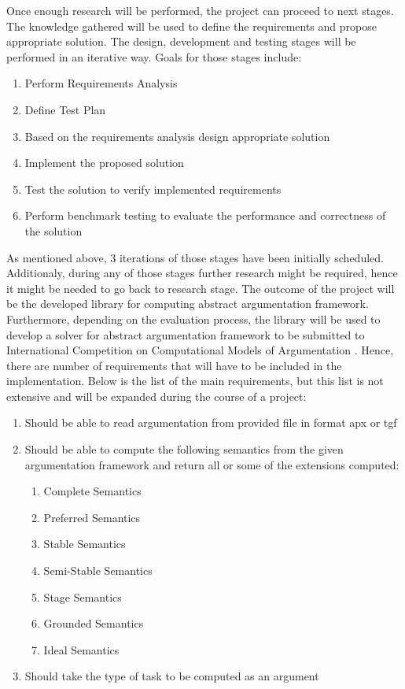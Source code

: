 Once enough research will be performed, the project can proceed to next stages. The knowledge gathered will be used to define the requirements and propose appropriate solution. The design, development and testing stages will be performed in an iterative way. Goals for those stages include:
\begin{enumerate}
	\item{Perform Requirements Analysis}
	\item{Define Test Plan}
	\item{Based on the requirements analysis design appropriate solution} 
	\item{Implement the proposed solution}
	\item{Test the solution to verify implemented requirements}
	\item{Perform benchmark testing to evaluate the performance and correctness of the solution}
\end{enumerate}
As mentioned above, 3 iterations of those stages have been initially scheduled. Additionaly, during any of those stages further research might be required, hence it might be needed to go back to research stage.
\newline
The outcome of the project will be the developed library for computing abstract argumentation framework. Furthermore, depending on the evaluation process, the library will be used to develop a solver for abstract argumentation framework to be submitted to International Competition on Computational Models of Argumentation \citep{ICCMA}. Hence, there are number of requirements that will have to be included in the implementation. Below is the list of the main requirements, but this list is not extensive and will be expanded during the course of a project:
\begin{enumerate}
	\item{Should be able to read argumentation from provided file in format apx or tgf}
	\item{Should be able to compute the following semantics from the given argumentation framework and return all or some of the extensions computed:}
		\begin{enumerate}
			\item{Complete Semantics}
			\item{Preferred Semantics}
			\item{Stable Semantics}
			\item{Semi-Stable Semantics}
			\item{Stage Semantics}
			\item{Grounded Semantics}
			\item{Ideal Semantics}
		\end{enumerate}
	\item{Should take the type of task to be computed as an argument}
\end{enumerate}
